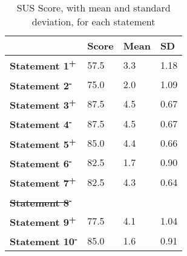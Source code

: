\documentclass[../main.tex]{subfiles}
\begin{document}
\begin{table}
\centering
\setlength{\tabcolsep}{10pt}
\renewcommand{\arraystretch}{1.5}
\begin{tabular}{|l|l|l|l|}
\hline
                      & \textbf{Score} & \textbf{Mean} & \textbf{SD} \\ \hline
\rowcolor[HTML]{EFEFEF} 
\textbf{Statement 1\textsuperscript{+}}  & 57.5           & 3.3           & 1.18        \\
\textbf{Statement 2\textsuperscript{-}}  & 75.0           & 2.0           & 1.09        \\
\rowcolor[HTML]{EFEFEF} 
\textbf{Statement 3\textsuperscript{+}}  & 87.5           & 4.5           & 0.67        \\
\textbf{Statement 4\textsuperscript{-}}  & 87.5           & 4.5           & 0.67        \\
\rowcolor[HTML]{EFEFEF} 
\textbf{Statement 5\textsuperscript{+}}  & 85.0           & 4.4           & 0.66        \\
\textbf{Statement 6\textsuperscript{-}}  & 82.5           & 1.7           & 0.90        \\
\rowcolor[HTML]{EFEFEF} 
\textbf{Statement 7\textsuperscript{+}}  & 82.5           & 4.3           & 0.64        \\
\textbf{\sout{Statement 8}\textsuperscript{-}}  &                &               &             \\
\rowcolor[HTML]{EFEFEF} 
\textbf{Statement 9\textsuperscript{+}}  & 77.5           & 4.1           & 1.04        \\
\textbf{Statement 10\textsuperscript{-}} & 85.0           & 1.6           & 0.91        \\ \hline
\end{tabular}
\caption{SUS Score, with mean and standard deviation, for each statement}%
\end{table}
\end{document}
